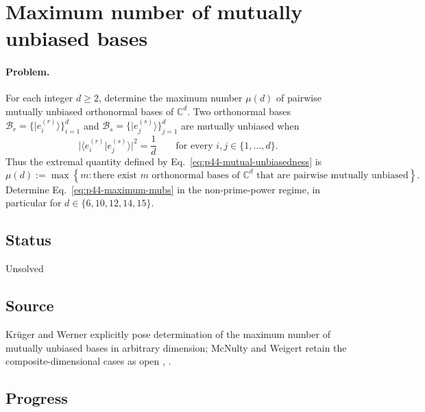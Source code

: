 \section{Maximum number of mutually unbiased bases}
\label{sec:problem-44}

\paragraph{Problem.}
For each integer $d\geq2$, determine the maximum number $\mu(d)$ of pairwise
mutually unbiased orthonormal bases of $\mathbb C^d$.  Two orthonormal bases
$\mathcal B_r=\{|e_i^{(r)}\rangle\}_{i=1}^{d}$ and
$\mathcal B_s=\{|e_j^{(s)}\rangle\}_{j=1}^{d}$ are mutually unbiased when
\begin{equation}
  \bigl|\langle e_i^{(r)}|e_j^{(s)}\rangle\bigr|^2=\frac1d
  \qquad\text{for every }i,j\in\{1,\ldots,d\}.
  \label{eq:p44-mutual-unbiasedness}
\end{equation}
Thus the extremal quantity defined by Eq.~\eqref{eq:p44-mutual-unbiasedness}
is
\begin{equation}
  \mu(d):=\max\left\{m:\text{there exist $m$ orthonormal bases of
  $\mathbb C^d$ that are pairwise mutually unbiased}\right\}.
  \label{eq:p44-maximum-mubs}
\end{equation}
Determine Eq.~\eqref{eq:p44-maximum-mubs} in the non-prime-power regime, in
particular for $d\in\{6,10,12,14,15\}$.

\subsection*{Status}

Unsolved

\subsection*{Source}

Kr\"uger and Werner explicitly pose determination of the maximum number of
mutually unbiased bases in arbitrary dimension; McNulty and Weigert retain
the composite-dimensional cases as open
,
.

\subsection*{Progress}

